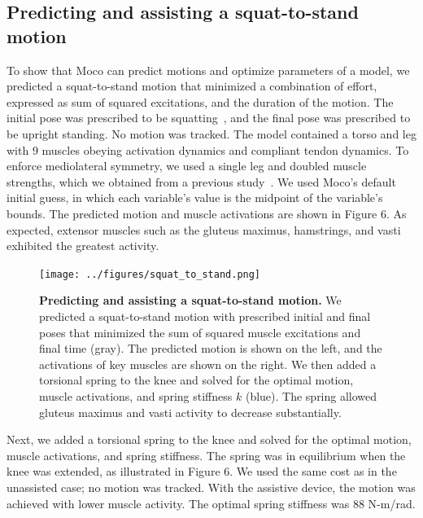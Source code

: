 \documentclass[10pt,letterpaper]{article}
\begin{document}
\subsection*{Predicting and assisting a squat-to-stand motion}

To show that Moco can predict motions and optimize parameters of a model, we predicted a squat-to-stand motion that minimized a combination of effort, expressed as sum of squared excitations, and the duration of the motion. The initial pose was prescribed to be squatting~\cite{Fregly:2015}, and the final pose was prescribed to be upright standing. No motion was tracked. The model contained a torso and leg with 9 muscles obeying activation dynamics and compliant tendon dynamics. To enforce mediolateral symmetry, we used a single leg and doubled muscle strengths, which we obtained from a previous study~\cite{Ong:2019a}. We used Moco's default initial guess, in which each variable's value is the midpoint of the variable's bounds. The predicted motion and muscle activations are shown in Figure 6. As expected, extensor muscles such as the gluteus maximus, hamstrings, and vasti exhibited the greatest activity.

\begin{figure}[!h]
    \begin{adjustwidth}{-1.125in}{-1.125in} %
        \centering
        \texttt{[image: ../figures/squat\_to\_stand.png]}
        \caption{{\bf Predicting and assisting a squat-to-stand motion.}
We predicted a squat-to-stand motion with prescribed initial and final poses that minimized the sum of squared muscle excitations and final time (gray). The predicted motion is shown on the left, and the activations of key muscles are shown on the right. We then added a torsional spring to the knee and solved for the optimal motion, muscle activations, and spring stiffness $k$ (blue). The spring allowed gluteus maximus and vasti activity to decrease substantially.
        }
        \label{squattotstand}
    \end{adjustwidth}
\end{figure}

Next, we added a torsional spring to the knee and solved for the optimal motion, muscle activations, and spring stiffness. The spring was in equilibrium when the knee was extended, as illustrated in Figure 6. We used the same cost as in the unassisted case; no motion was tracked. With the assistive device, the motion was achieved with lower muscle activity. The optimal spring stiffness was 88 N-m/rad.
\end{document}
